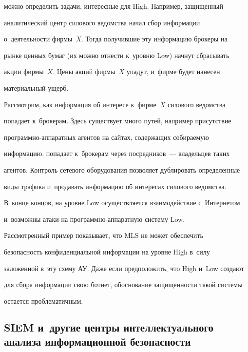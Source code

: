 можно определить задачи, интересные для High. Например, защищенный 


аналитический центр силового ведомства начал сбор информации 


о~деятельности фирмы~$X$. Тогда получившие эту информацию брокеры на 


рынке ценных бумаг (их можно отнести к~уровню Low) начнут сбрасывать 


акции фирмы~$X$. Цены акций фирмы~$X$ упадут, и~фирме будет нанесен 


материальный ущерб. 


  


  Рассмотрим, как информация об интересе к~фирме~$X$ силового ведомства 


попадает к~брокерам. Здесь существует много путей, например присутствие 


про\-грам\-мно-ап\-па\-рат\-ных агентов на сайтах, содержащих собираемую 


информацию, попадает к~брокерам через посредников~--- владельцев таких 


агентов. Контроль сетевого оборудования позволяет дублировать определенные 


виды трафика и~продавать информацию об интересах силового ведомства. 


В~конце концов, на уровне Low осуществляется взаимодействие с~Интернетом 


и~возможны атаки на про\-граммно-ап\-па\-рат\-ную систему Low.


  


  Рассмотренный пример показывает, что MLS не может обеспечить 


без\-опас\-ность конфиденциальной информации на уровне High в~силу 


заложенной в~эту схему АУ. Даже если предположить, что High и~Low создают 


для сбора информации свою ботнет, обоснование защищенности такой системы 


остается проблематичным.


  


\subsection{SIEM и~другие центры интеллектуального анализа информационной безопасности} 


